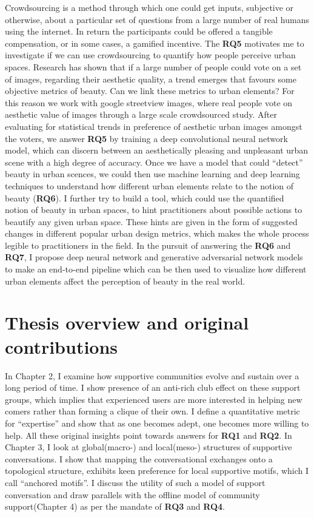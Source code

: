 Crowdsourcing is a method through which one could get inputs, subjective or otherwise, about a particular set of questions from a large number of real humans using the internet. In return the participants could be offered a tangible compensation, or in some cases, a gamified incentive. 
The \textbf{RQ5} motivates me to investigate if we can use crowdsourcing to quantify how people perceive urban spaces. Research has shown that if a large number of people could vote on a set of images, regarding their aesthetic quality, a trend emerges that favours some objective metrics of beauty\cite{datta2008algorithmic,quercia2014aesthetic}. Can we link these metrics to urban elements? For this reason we work with google streetview images, where real people vote on aesthetic value of images through a large scale crowdsourced study. After evaluating for statistical trends in preference of aesthetic urban images amongst the voters, we answer \textbf{RQ5} by training a deep convolutional neural network model, which can discern between an aesthetically pleasing and unpleasant urban scene with a high degree of accuracy. Once we have a model that could ``detect'' beauty in urban scences, we could then use machine learning and deep learning techniques to understand how different urban elements relate to the notion of beauty (\textbf{RQ6}). I further try to build a tool, which could use the quantified notion of beauty in urban spaces, to hint practitioners about possible actions to beautify any given urban space. These hints are given in the form of suggested changes in different popular urban design metrics, which makes the whole process legible to practitioners in the field. In the pursuit of answering the \textbf{RQ6} and  \textbf{RQ7}, I propose deep neural network and generative adversarial network models to make an end-to-end pipeline which can be then used to visualize how different urban elements affect the perception of beauty in the real world.


\section{Thesis overview and original contributions}
In Chapter 2, I examine how supportive communities evolve and sustain over a long period of time. I show presence of an anti-rich club effect on these support groups, which implies that experienced users are more interested in helping new comers rather than forming a clique of their own. I define a quantitative metric for ``expertise'' and show that as one becomes adept, one becomes more willing to help. All these original insights point towards answers for \textbf{RQ1} and \textbf{RQ2}. In Chapter 3, I look at global(macro-) and local(meso-) structures of supportive conversations. I show that mapping the conversational exchanges onto a topological structure, exhibits keen preference for local supportive motifs, which I call ``anchored motifs''. I discuss the utility of such a model of support conversation and draw parallels with the offline model of community support(Chapter 4) as per the mandate of \textbf{RQ3} and \textbf{RQ4}. 

